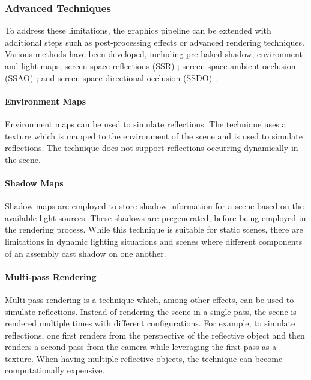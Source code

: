 \subsubsection{Advanced Techniques}

To address these limitations, the graphics pipeline can be extended with additional steps such as post-processing effects or advanced rendering techniques. Various methods have been developed, including pre-baked shadow, environment \cite{greene1986environment} and light maps; screen space reflections (SSR) \cite{screenSpaceReflectionsStackowiak}; screen space ambient occlusion (SSAO) \cite{bavoil2008ssao}; and screen space directional occlusion (SSDO) \cite{ritschel2009ssdo}.

\paragraph{Environment Maps}

Environment maps can be used to simulate reflections. The technique uses a texture which is mapped to the environment of the scene and is used to simulate reflections. The technique does not support reflections occurring dynamically in the scene.

\paragraph{Shadow Maps}

Shadow maps are employed to store shadow information for a scene based on the available light sources. These shadows are pregenerated, before being employed in the rendering process. While this technique is suitable for static scenes, there are limitations in dynamic lighting situations and scenes where different components of an assembly cast shadow on one another.

\paragraph{Multi-pass Rendering}

Multi-pass rendering is a technique which, among other effects, can be used to simulate reflections. Instead of rendering the scene in a single pass, the scene is rendered multiple times with different configurations. For example, to simulate reflections, one first renders from the perspective of the reflective object and then renders a second pass from the camera while leveraging the first pass as a texture. When having multiple reflective objects, the technique can become computationally expensive.


